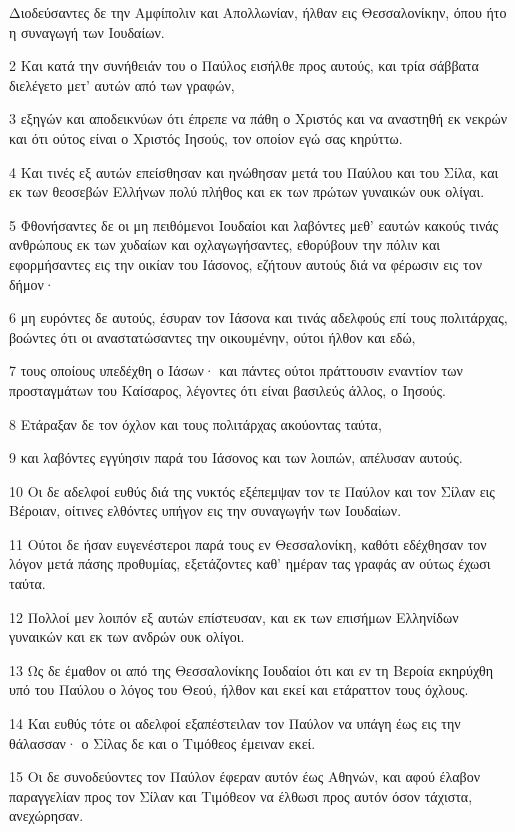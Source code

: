 \par Διοδεύσαντες δε την Αμφίπολιν και Απολλωνίαν, ήλθαν εις Θεσσαλονίκην, όπου ήτο η συναγωγή των Ιουδαίων.
\par 2 Και κατά την συνήθειάν του ο Παύλος εισήλθε προς αυτούς, και τρία σάββατα διελέγετο μετ' αυτών από των γραφών,
\par 3 εξηγών και αποδεικνύων ότι έπρεπε να πάθη ο Χριστός και να αναστηθή εκ νεκρών και ότι ούτος είναι ο Χριστός Ιησούς, τον οποίον εγώ σας κηρύττω.
\par 4 Και τινές εξ αυτών επείσθησαν και ηνώθησαν μετά του Παύλου και του Σίλα, και εκ των θεοσεβών Ελλήνων πολύ πλήθος και εκ των πρώτων γυναικών ουκ ολίγαι.
\par 5 Φθονήσαντες δε οι μη πειθόμενοι Ιουδαίοι και λαβόντες μεθ' εαυτών κακούς τινάς ανθρώπους εκ των χυδαίων και οχλαγωγήσαντες, εθορύβουν την πόλιν και εφορμήσαντες εις την οικίαν του Ιάσονος, εζήτουν αυτούς διά να φέρωσιν εις τον δήμον·
\par 6 μη ευρόντες δε αυτούς, έσυραν τον Ιάσονα και τινάς αδελφούς επί τους πολιτάρχας, βοώντες ότι οι αναστατώσαντες την οικουμένην, ούτοι ήλθον και εδώ,
\par 7 τους οποίους υπεδέχθη ο Ιάσων· και πάντες ούτοι πράττουσιν εναντίον των προσταγμάτων του Καίσαρος, λέγοντες ότι είναι βασιλεύς άλλος, ο Ιησούς.
\par 8 Ετάραξαν δε τον όχλον και τους πολιτάρχας ακούοντας ταύτα,
\par 9 και λαβόντες εγγύησιν παρά του Ιάσονος και των λοιπών, απέλυσαν αυτούς.
\par 10 Οι δε αδελφοί ευθύς διά της νυκτός εξέπεμψαν τον τε Παύλον και τον Σίλαν εις Βέροιαν, οίτινες ελθόντες υπήγον εις την συναγωγήν των Ιουδαίων.
\par 11 Ούτοι δε ήσαν ευγενέστεροι παρά τους εν Θεσσαλονίκη, καθότι εδέχθησαν τον λόγον μετά πάσης προθυμίας, εξετάζοντες καθ' ημέραν τας γραφάς αν ούτως έχωσι ταύτα.
\par 12 Πολλοί μεν λοιπόν εξ αυτών επίστευσαν, και εκ των επισήμων Ελληνίδων γυναικών και εκ των ανδρών ουκ ολίγοι.
\par 13 Ως δε έμαθον οι από της Θεσσαλονίκης Ιουδαίοι ότι και εν τη Βεροία εκηρύχθη υπό του Παύλου ο λόγος του Θεού, ήλθον και εκεί και ετάραττον τους όχλους.
\par 14 Και ευθύς τότε οι αδελφοί εξαπέστειλαν τον Παύλον να υπάγη έως εις την θάλασσαν· ο Σίλας δε και ο Τιμόθεος έμειναν εκεί.
\par 15 Οι δε συνοδεύοντες τον Παύλον έφεραν αυτόν έως Αθηνών, και αφού έλαβον παραγγελίαν προς τον Σίλαν και Τιμόθεον να έλθωσι προς αυτόν όσον τάχιστα, ανεχώρησαν.
